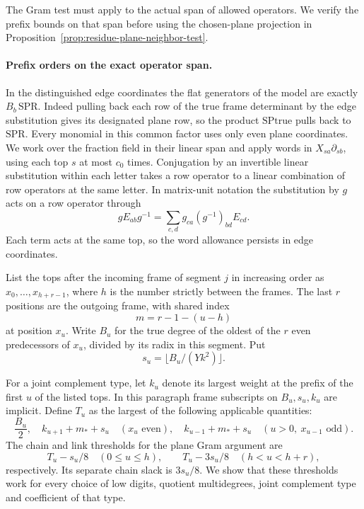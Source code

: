 The Gram test must apply to the actual span of allowed
operators. We verify the prefix bounds on that span before
using the chosen-plane projection in
Proposition~\ref{prop:residue-plane-neighbor-test}.
\paragraph{Prefix orders on the exact operator span.}
\label{par:plane-orbit}
\hypertarget{source-plane-orbit}{}
In the distinguished edge coordinates the flat generators of the model
are exactly \(B_b\,\mathrm{SPR}\). Indeed pulling back each row of the
true frame determinant by the edge substitution gives its designated
plane row, so the product \(\mathrm{SPtrue}\) pulls back to
\(\mathrm{SPR}\). Every monomial in this common factor uses only
even plane coordinates. We work over the fraction field in their
linear span and apply words in \(X_{sa}\partial_{sb}\), using each
top \(s\) at most \(c_0\) times. Conjugation by an invertible linear
substitution within each letter takes a row operator to a linear
combination of row operators at the same letter. In matrix-unit notation the substitution by \(g\) acts on a row operator through
\[
 gE_{ab}g^{-1}=\sum_{c,d}g_{ca}(g^{-1})_{bd}E_{cd}.
\]
Each term acts at the same top, so the word allowance persists in edge coordinates.

List the tops after the incoming frame of segment \(j\) in increasing
order as \(x_0,\ldots,x_{h+r-1}\), where \(h\) is the number strictly
between the frames. The last \(r\) positions are the outgoing frame,
with shared index
\[
 m=r-1-(u-h)
\]
at position \(x_u\).
Write \(B_u\) for the true degree of the oldest of the \(r\) even
predecessors of \(x_u\), divided by its radix in this segment. Put
\[
 s_u=\lfloor B_u/(Yk^2)\rfloor.
\]

For a joint complement type,
let \(k_u\) denote its largest weight at the prefix of the first
\(u\) of the listed tops. In this paragraph frame subscripts on
\(B_u,s_u,k_u\) are implicit. Define \(T_u\) as the largest of
the following applicable quantities:
\[
 \frac{B_u}{2},\quad k_{u+1}+m_*+s_u\quad(x_u\text{ even}),\quad
 k_{u-1}+m_*+s_u\quad(u>0,\ x_{u-1}\text{ odd}).
\]
The chain and link thresholds for the plane Gram argument are
\begin{equation}\label{eq:plane-chain-link-thresholds}
   T_u-s_u/8\quad(0\le u\le h),\qquad
   T_u-3s_u/8\quad(h<u<h+r),
\end{equation}
respectively. Its separate chain
slack is \(3s_u/8\). We show that these thresholds work for
every choice of low digits, quotient multidegrees, joint
complement type and coefficient of that type.

